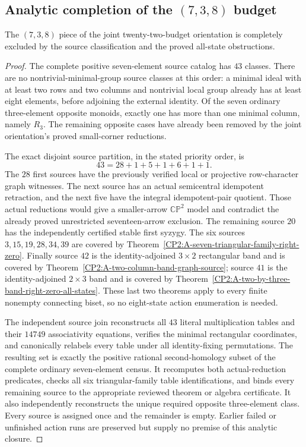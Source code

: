\subsection{Analytic completion of the $(7,3,8)$ budget}

\begin{proposition}
\label{CP2:A-oriented-eighteen-seven-three-eight}
The $(7,3,8)$ piece of the joint twenty-two-budget orientation is
completely excluded by the source classification and the proved
all-state obstructions.
\end{proposition}
\begin{proof}
The complete positive seven-element source catalog has $43$ classes.
There are no nontrivial-minimal-group source classes at this order:
a minimal ideal with at least two rows and two columns and nontrivial
local group already has at least eight elements, before adjoining the
external identity.  Of the seven ordinary three-element opposite
monoids, exactly one has more than one minimal column, namely $R_3$.
The remaining opposite cases have already been removed by the joint
orientation's proved small-corner reductions.

The exact disjoint source partition, in the stated priority order, is
\[
 43=28+1+5+1+6+1+1.
\]
The $28$ first sources have the previously verified local or projective
row-character graph witnesses.  The next source has an actual
semicentral idempotent retraction, and the next five have the integral
idempotent-pair quotient.  Those actual reductions would give a
smaller-arrow $\mathbb{CP}^2$ model and contradict the already proved
unrestricted seventeen-arrow exclusion.
The remaining source $20$ has the independently certified stable first
syzygy.  The six sources $3,15,19,28,34,39$ are covered by
Theorem~\ref{CP2:A-seven-triangular-family-right-zero}.
Finally source $42$ is the identity-adjoined $3\times2$ rectangular band
and is covered by Theorem~\ref{CP2:A-two-column-band-graph-source};
source $41$ is the identity-adjoined $2\times3$ band and is covered by
Theorem~\ref{CP2:A-two-by-three-band-right-zero-all-states}.
These last two theorems apply to every finite nonempty connecting
biset, so no eight-state action enumeration is needed.

The independent source join
reconstructs all $43$ literal multiplication tables and their $14749$
associativity equations, verifies the minimal rectangular coordinates,
and canonically relabels every table under all identity-fixing
permutations.  The resulting set is exactly the positive rational
second-homology subset of the complete ordinary seven-element census.
It recomputes both actual-reduction predicates, checks all six
triangular-family table identifications, and binds every remaining
source to the appropriate reviewed theorem or algebra certificate.
It also independently reconstructs the unique required opposite
three-element class.  Every source is assigned once and the remainder
is empty.  Earlier failed or unfinished action runs are preserved but
supply no premise of this analytic closure.
\end{proof}

